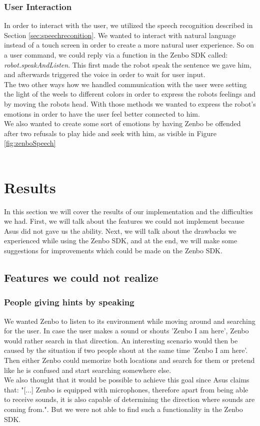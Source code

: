 \documentclass[conference]{IEEEtran}
\begin{document}
\subsubsection{User Interaction}
In order to interact with the user, we utilized the speech recognition described in Section \ref{sec:speechreconition}. We wanted to 
interact with natural language instead of a touch screen in order to create a more natural user experience.
So on a user command, we could reply via a function in the Zenbo SDK called: \textit{robot.speakAndListen}. This first made the robot speak the sentence we 
gave him, and afterwards triggered the voice in order to wait for user input.\\
The two other ways how we handled communication with the user were setting the light of the weels to different colors in order to express the robots feelings and 
by moving the robots head. With those methods we wanted to express the robot's emotions in order to have the user feel better connected to him.\\
We also wanted to create some sort of emotions by having Zenbo be offended after two refusals to play hide and seek with him, as visible in Figure \ref{fig:zenboSpeech}
\\\\
\section{Results}
In this section we will cover the results of our implementation and the difficulties we had.
First, we will talk about the features we could not implement because Asus did not gave us the ability. 
Next, we will talk about the drawbacks we experienced while using the Zenbo SDK, and at the end, we will make some suggestions for improvements which could be made on the Zenbo SDK.
\subsection{Features we could not realize} \label{sec:drawbacks}
\subsubsection{People giving hints by speaking}
We wanted Zenbo to listen to its environment while moving around and searching for the user. In case the user makes a sound or shouts 'Zenbo I am here', 
Zenbo would rather search in that direction. An interesting scenario would then be caused by the situation if two people shout at the same time 'Zenbo I am here'.
Then either Zenbo could memorize both locations and search for them or pretend like he is confused and start searching somewhere else.\\
We also thought that it would be possible to achieve this goal since Asus claims that: 
"[...] Zenbo is equipped with microphones, therefore apart from being able to receive sounds, it is also capable of determining the direction where sounds are coming from.". \cite{b5}
But we were not able to find such a functionality in the Zenbo SDK.
\end{document}
